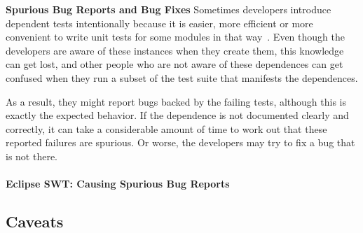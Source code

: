 \noindent \textbf{Spurious Bug Reports and Bug Fixes}
Sometimes developers introduce dependent tests intentionally because it is
easier, more efficient or more convenient to write unit tests for some modules
in that way~\cite{kapfhammeretal:FSE:2003, whittakeretal:2012}.
Even though the developers are aware of these instances
when they create them, this knowledge can get lost, 
and other people who are not aware of these dependences can get confused 
when they run a subset of the test suite that manifests the
dependences.

As a result, they
might report bugs backed by the failing tests, although this is exactly the expected
behavior. If the dependence is not documented clearly and
correctly, it can take a considerable amount of time to work out that
these reported failures are spurious. Or worse, the developers may try
to fix a bug that is not there.

\paragraph{Eclipse SWT: Causing Spurious Bug Reports}


\subsection{Caveats}
